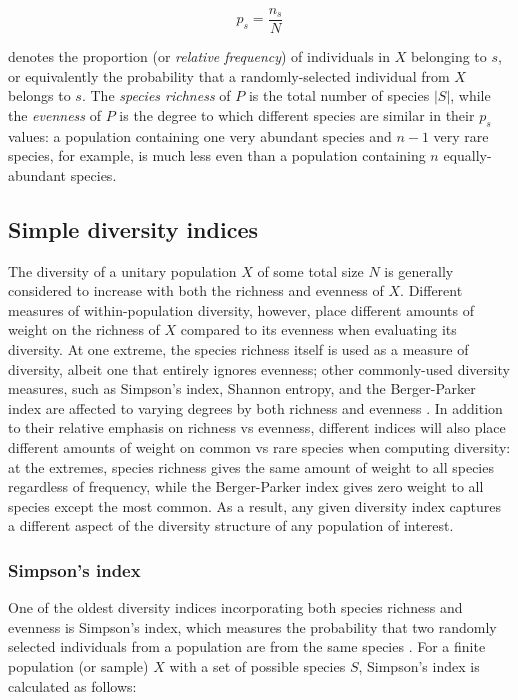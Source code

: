 \begin{equation}
p_s = \frac{n_s}{N}
\label{eq:species_proportion}
\end{equation}

\noindent denotes the proportion (or \textit{relative frequency}) of individuals in $X$ belonging to $s$, or equivalently the probability that a randomly-selected individual from $X$ belongs to $s$. The \textit{species richness} of $P$ is the total number of species $|S|$, while the \textit{evenness} of $P$ is the degree to which different species are similar in their $p_s$ values: a population containing one very abundant species and $n-1$ very rare species, for example, is much less even than a population containing $n$ equally-abundant species.

\subsection{Simple diversity indices}
\label{app:diversity-unitary-simple}

The diversity of a unitary population $X$ of some total size $N$ is generally considered to increase with both the richness and evenness of $X$. Different measures of within-population diversity, however, place different amounts of weight on the richness of $X$ compared to its evenness when evaluating its diversity. At one extreme, the species richness itself is used as a measure of diversity, albeit one that entirely ignores evenness; other commonly-used diversity measures, such as Simpson's index, Shannon entropy, and the Berger-Parker index are affected to varying degrees by both richness and evenness \parencite{peet1974diversity,berger1970diversity}. In addition to their relative emphasis on richness vs evenness, different indices will also place different amounts of weight on common vs rare species when computing diversity: at the extremes, species richness gives the same amount of weight to all species regardless of frequency, while the Berger-Parker index gives zero weight to all species except the most common. As a result, any given diversity index captures a different aspect of the diversity structure of any population of interest.

\subsubsection{Simpson's index}

One of the oldest diversity indices incorporating both species richness and evenness is Simpson's index, which measures the probability that two randomly selected individuals from a population are from the same species \citep{simpson1949diversity}. For a finite population (or sample) $X$ with a set of possible species $S$, Simpson's index is calculated as follows:


